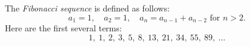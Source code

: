

\setcounter{section}{1}
\setcounter{subsection}{1}
\setcounter{dfn}{0}

The \emph{Fibonacci sequence} is defined as follows:
\[
a_1 = 1, \quad a_2 = 1, \quad a_n = a_{n-1} + a_{n-2} \text{ for }n > 2.
\]
Here are the first several terms:
\[
1,\ 1,\ 2,\ 3,\ 5,\ 8,\ 13,\ 21,\ 34,\ 55,\ 89,\ \ldots
\]



